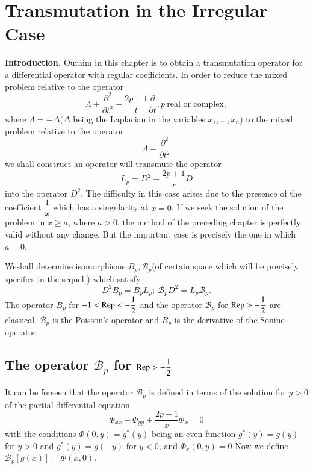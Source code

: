 
\chapter{Transmutation in the Irregular Case}\label{part1:chap3} %
 
 \textbf{ Introduction.} Our\pageoriginale aim in this chapter is to obtain a
 transmutation operator for a differential operator with regular
 coefficients. In order to reduce the mixed problem relative to the
 operator  
 $$
 \Lambda + \frac{\partial ^2 }{\partial t^2} + \frac{2  p + 1}{t}
 \frac{\partial} {\partial t}, p ~\text{real or complex},  
 $$
 where $\Lambda =-  \Delta ( \Delta$ being the Laplacian in the
 variables $x_1,  \ldots,  x_n$) to the mixed problem relative to the
 operator  
 $$
 \Lambda + \frac{\partial ^2}{\partial t^2} 
 $$
 we shall construct an operator will transmute the operator 
 $$
 L_p = D^2 + \frac{2 p + 1}{x}D
 $$
 into the operator $D^2$. The difficulty in this case arises due to
 the presence of the coefficient $\dfrac{1}{x}$ which has a singularity
 at $x = 0$. If we seek the solution of the problem in $x \geq a$,
 where $a > 0$,  the method of the preceding chapter is perfectly
 valid without any change. But the important case is precisely the one
 in which $a = 0$.   
 
 We\pageoriginale shall determine isomorphisms $B_p,  \mathscr{B}_p$(of certain space
 which will be precisely specifies in the sequel ) which satisfy  
 $$
 D^2 B_p = B_p L_p ; ~\mathscr{B} _p D^2 = L_p \mathscr{B}_p. 
 $$
 The operator $B_p$ for $-1 <  \operatorname{Rep}< - \dfrac{1}{2}$ and the operator
 $\mathscr{B}_p$ for $\operatorname{Rep} > - \dfrac{1}{2}$ are
 classical. $\mathscr{B}_p$ is the Poisson's operator and $B_p$ is the
 derivative of the Sonine operator.  
 
 \section{The operator $\mathscr{B}_p$ for $\operatorname{Rep}> -
   \dfrac{1}{2}$}\label{part1:chap3:sec1}
 

 It can be forseen that the operator $\mathscr{B}_p$  is defined in
 terms of the solution for $y > 0$ of the partial differential
 equation  
 $$
 \Phi _{xx} - \Phi_{yy} + \frac{2 p + 1}{x} \Phi_x = 0
 $$
 with the conditions $\Phi (0, y) = g^* (y)$ being an even function
 $g^* (y) =g(y)$ for $ y > 0$ and $g^* (y) = g (-y)$ for $y < 0$, and
 $\Phi _x (0, y) = 0$ Now we define $\mathscr{B}_p [ g(x)] = \Phi (x,
 0)$.  
 
